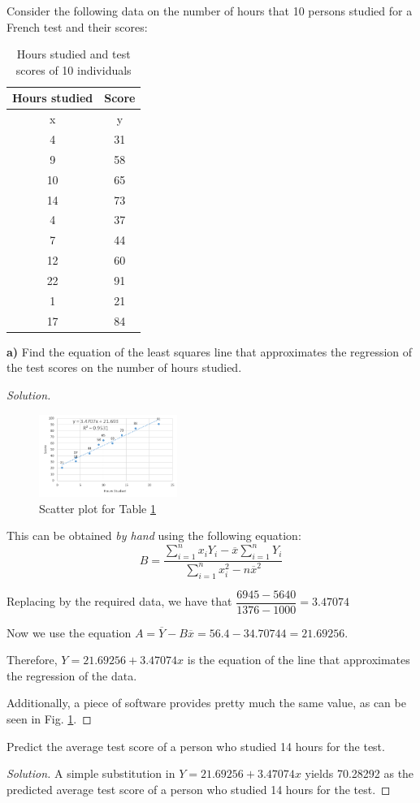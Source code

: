 \documentclass[titlepage, letterpaper, fleqn]{article}
\newcommand{\spacepls}{\vspace{5mm}}
\renewcommand\qedsymbol{\(\blacksquare\)}
\newenvironment{solution}
{\renewcommand\qedsymbol{$\square$}\begin{proof}[Solution]}
{\end{proof}}
\begin{document}
{\large Consider the following data on the number of hours that 10 persons studied for a French test and their scores:}

\begin{table}[h!]
\centering
\begin{tabular}{@{}cc@{}}
\toprule
Hours studied & Score \\ \midrule
x & y \\
4 & 31 \\
9 & 58 \\
10 & 65 \\
14 & 73 \\
4 & 37 \\
7 & 44 \\
12 & 60 \\
22 & 91 \\
1 & 21 \\
17 & 84 \\ \bottomrule
\end{tabular}
\caption{Hours studied and test scores of 10 individuals}
\label{tab4.5.2}
\end{table}


{\large \textbf{a)} Find the equation of the least squares line that approximates the regression of the test scores on the number of hours studied.}

\begin{solution}
\begin{figure}[h!]
	\centering
	\includegraphics[width=0.4\textwidth]{img_4_5_2}
	\caption{Scatter plot for Table \ref{tab4.5.2}}
	\label{fig:4.5.2}
\end{figure}


This can be obtained \textit{by hand} using the following equation:
\[B = \frac{\sum\limits_{i=1}^n x_i Y_i - \overline{x}\sum\limits_{i=1}^n Y_i}{\sum\limits_{i=1}^n x_i^2 - n \overline{x}^2}\]

Replacing by the required data, we have that $\dfrac{6945 - 5640}{1376 - 1000} = 3.47074$

Now we use the equation $A = \overline{Y} - B\overline{x} = 56.4- 34.70744 = 21.69256$.

Therefore, $Y = 21.69256 + 3.47074x$ is the equation of the line that approximates the regression of the data.

Additionally, a piece of software provides pretty much the same value, as can be seen in Fig. \ref{fig:4.5.2}.
\end{solution}

\spacepls

{\large Predict the average test score of a person who studied 14 hours for the test.}

\begin{solution}
A simple substitution in $Y = 21.69256 + 3.47074x$ yields 70.28292 as the predicted average test score of a person who studied 14 hours for the test.
\end{solution}
\end{document}
